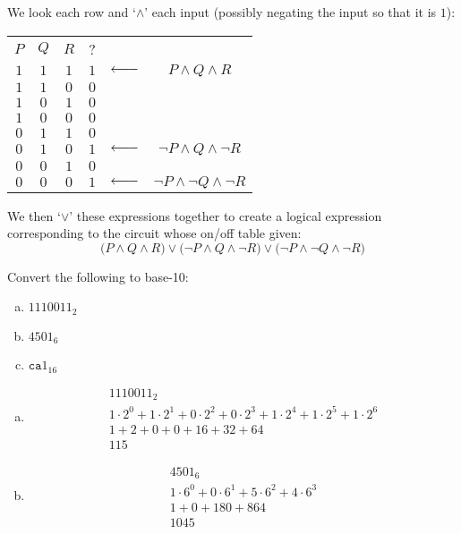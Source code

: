 \documentclass[12pt,letterpaper]{exam}
\DeclareRobustCommand{\longerleftarrow}{\DOTSB\leftarrow\joinrel\relbar\joinrel\relbar} %
\begin{document}
\begin{questions}
\sol We look each row and `$\wedge$' each input (possibly negating the input so that it is $1$): \par
	\begin{table}[h]
	\centering
	\begin{tabular}{c|c|c|c lc}
	$P$ & $Q$ & $R$ & ? \\ \cline{1-4}
	$1$ & $1$ & $1$ & $1$ & $\longerleftarrow$ & $P \wedge Q \wedge R$ \\
	$1$ & $1$ & $0$ & $0$ \\
	$1$ & $0$ & $1$ & $0$ \\
	$1$ & $0$ & $0$ & $0$ \\
	$0$ & $1$ & $1$ & $0$ \\
	$0$ & $1$ & $0$ & $1$ & $\longerleftarrow$ & $\neg P \wedge Q \wedge \neg R$ \\
	$0$ & $0$ & $1$ & $0$ \\
	$0$ & $0$ & $0$ & $1$ & $\longerleftarrow$ & $\neg P \wedge \neg Q \wedge \neg R$
	\end{tabular}
	\end{table} \par
We then `$\vee$' these expressions together to create a logical expression corresponding to the circuit whose on/off table given:
	\[
	\big(P \wedge Q \wedge R \big) \vee \big(\neg P \wedge Q \wedge \neg R \big) \vee \big(\neg P \wedge \neg Q \wedge \neg R \big)
	\]



\newpage
\question[10] Convert the following to base-10:
	\begin{enumerate}[(a)]
	\item $1110011_2$
	\item $4501_6$
	\item $\texttt{ca}1_{16}$
	\end{enumerate} \pspace

\sol 
\begin{enumerate}[(a)]
\item 
	\[
	\begin{gathered}
	1110011_2 \\[0.2cm]
	1 \cdot 2^0 + 1 \cdot 2^1 + 0 \cdot 2^2 + 0 \cdot 2^3 + 1 \cdot 2^4 + 1 \cdot 2^5 + 1 \cdot 2^6 \\[0.3cm]
	1 + 2 + 0 + 0 + 16 + 32 + 64 \\[0.2cm]
	115
	\end{gathered}
	\] \pspace

\item 
	\[
	\begin{gathered}
	4501_6 \\[0.2cm]
	1 \cdot 6^0 + 0 \cdot 6^1 + 5 \cdot 6^2 + 4 \cdot 6^3 \\[0.2cm]
	1 + 0 + 180 + 864 \\[0.2cm]
	1045
	\end{gathered}
	\] \pspace


\end{enumerate}
\end{questions}
\end{document}
